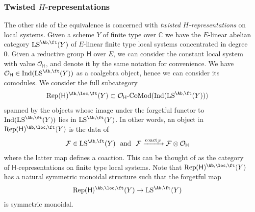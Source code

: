 \documentclass[10pt]{amsart}
\newcommand{\sssec}{\subsubsection}
\theoremstyle{remark}
\newcommand{\te}{\text}
\newcommand{\C}{\mathbb{C}}
\newcommand{\on}{\operatorname}
\newcommand{\cF}{\mathcal{F}}
\newcommand{\cO}{\mathcal{O}}
\newcommand{\Rep}{\on{Rep}}
\newcommand{\LS}{\on{LS}}
\DeclareMathOperator{\Ind}{Ind}
\begin{document}
\sssec{Twisted $H$-representations}\label{sssec: twisted H reps}
The other side of the equivalence is concerned with \emph{twisted} $H$\emph{-representations} on local systems. Given a scheme $Y$ of finite type over $\C$ we have the $E$-linear abelian category $\LS^{\Ab,\ft}(Y)$ of $E$-linear finite type local systems concentrated in degree $0$. Given a reductive group $\mathsf{H}$ over $E$, we can consider the constant local system with value $\cO_{\mathsf{H}}$, and denote it by the same notation for convenience. We have $\cO_{\mathsf{H}}\in \Ind(\LS^{\Ab,\ft}(Y))$ as a coalgebra object, hence we can consider its comodules. We consider the full subcategory 
\[\Rep(\mathsf{H})^{\Ab,\loc,\ft}(Y)\subset \cO_{\mathsf{H}}\te{-CoMod}(\Ind(\LS^{\Ab,\ft}(Y)))\]
spanned by the objects whose image under the forgetful functor to $\Ind(\LS^{\Ab,\ft}(Y))$ lies in $\LS^{\Ab,\ft}(Y)$. In other words, an object in $\Rep(\mathsf{H})^{\Ab,\loc,\ft}(Y)$ is the data of
\begin{equation}\label{eq: objects of lisse repn}
    \cF\in \LS^{\Ab,\ft}(Y) \ \te{ and } \ \cF\xrightarrow{\on{coact}_{\cF}} \cF\otimes\cO_{\mathsf{H}}
\end{equation}
where the latter map defines a coaction. This can be thought of as the category of $\mathsf{H}$-representations on finite type local systems. Note that $\Rep(\mathsf{H})^{\Ab,\loc,\ft}(Y)$ has a natural symmetric monoidal structure such that the forgetful map
\[\Rep(\mathsf{H})^{\Ab,\loc,\ft}(Y)\rightarrow \LS^{\Ab,\ft}(Y)\]
is symmetric monoidal. 
\medskip
\end{document}
